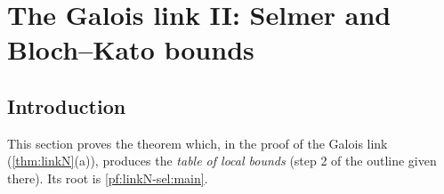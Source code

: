 \section{The Galois link II: Selmer and Bloch--Kato bounds}\label{sec:pf:linkN-sel}

\providecommand{\linkNselvcc}{v_{\mathrm{cc}}}
\providecommand{\linkNselsP}{s_{\Pi}}
\providecommand{\linkNseleta}{\eta_{\mathrm{loc}}}
\providecommand{\linkNselmult}{\mathrm{mult}}
\providecommand{\linkNselZg}{Z^{\mathrm{good}}}
\providecommand{\linkNsellst}{\ell^{*}}
\providecommand{\linkNsellen}{\operatorname{len}_{\ell}}
\providecommand{\linkNselSel}{\operatorname{Sel}}
\providecommand{\linkNselG}{\mathcal G}
\providecommand{\linkNselP}{\mathcal P_0}
\providecommand{\linkNselexc}{\mathrm{exc}}
\providecommand{\linkNselExc}{\mathrm{Exc}}
\providecommand{\linkNselerr}{\mathrm{err}}
\providecommand{\linkNselB}{\mathrm{B}}
\providecommand{\linkNselT}{\mathcal T}
\providecommand{\linkNselbsm}{\beta_{\mathrm{sm}}}
\providecommand{\linkNselbqd}{\beta_{qd}}

\subsection{Introduction}\label{sec:pf:linkN-sel:intro}

This section proves the theorem which, in the proof of the Galois link (\cref{thm:linkN}(a)), produces the
\emph{table of local bounds} (step 2 of the outline given there). Its root is \cref{pf:linkN-sel:main}.

